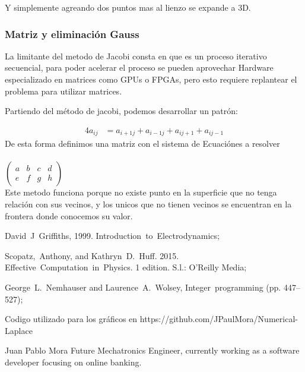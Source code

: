 \documentclass[10pt,journal,compsoc]{IEEEtran}
\begin{document}
Y simplemente agreando dos puntos mas al lienzo se expande a 3D.

\subsubsection{Matriz y eliminación Gauss}

La limitante del metodo de Jacobi consta en que es un proceso iterativo
secuencial, para poder acelerar el proceso se pueden aprovechar Hardware
especializado en matrices como GPUs o FPGAs, pero esto requiere replantear
el problema para utilizar matrices.

Partiendo del método de jacobi, podemos desarrollar un patrón:

\begin{align*}
  4 a_{ij} &= a_{i+1j} + a_{i-1j} + a_{ij+1} + a_{ij-1}
\end{align*}
De esta forma definimos una matriz con el sistema de Ecuaciónes a resolver\\\\
$\begin{pmatrix}
  a & b & c & d\\ 
  e & f & g & h
\end{pmatrix}$ 
\\
Este metodo funciona porque no existe punto en la superficie que no tenga relación
con sus vecinos, y los unicos que no tienen vecinos se encuentran en la frontera
donde conocemos su valor.


\begin{thebibliography}{1}

David~J~Griffiths, 1999. Introduction~to~Electrodynamics;

Scopatz,~Anthony, and Kathryn~D.~Huff. 2015. Effective~Computation~in~Physics. 1 edition. S.l.: O’Reilly Media;

George~L.~Nemhauser and Laurence~A.~Wolsey, Integer~programming (pp. 447–527);
\end{thebibliography}

Codigo utilizado para los gráficos en https://github.com/JPaulMora/Numerical-Laplace

\begin{IEEEbiographynophoto}{Juan Pablo Mora}
Future Mechatronics Engineer, currently working as a software developer focusing on online banking.
\end{IEEEbiographynophoto}
\end{document}
